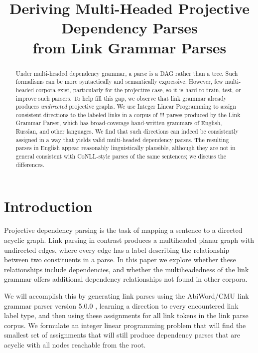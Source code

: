 \documentclass[11pt]{article}
\title{Deriving Multi-Headed Projective Dependency Parses \\ from Link Grammar Parses}
\date{}
\newcommand{\Note}[4][]{\todo[author=#2,color=#3,fancyline,#1]{#4}}
\newcommand{\noteJE}[2][]{\Note[#1]{JE}{green!40}{#2}}
\begin{document}
\maketitle

\begin{abstract}
Under multi-headed dependency grammar, a parse is a DAG rather than a tree.  Such formalisms can be more syntactically and semantically expressive.  However, few multi-headed corpora exist, particularly for the projective case, so it is hard to train, test, or improve such parsers.
To help fill this gap, we observe that link grammar already produces {\em undirected} projective graphs.  
We use Integer Linear Programming to assign consistent directions to the labeled links in a corpus of !!! \noteJE{fill in the number} parses produced by the Link Grammar Parser, which has broad-coverage hand-written grammars of English, Russian, and other languages.  We find that such directions can indeed be consistently assigned in a way that yields valid multi-headed dependency parses. The resulting parses in English appear reasonably linguistically plausible, although they are not in general consistent with CoNLL-style parses of the same sentences; we discuss the differences.  
\end{abstract}


\section{Introduction}
Projective dependency parsing is the task of mapping a sentence to a directed acyclic graph.  
Link parsing in contrast produces a multiheaded planar graph with undirected edges, where every edge has a label describing the relationship between two constituents in a parse. In this paper we explore whether these relationships include dependencies, and whether the multiheadedness of the link grammar offers additional dependency relationships not found in other corpora.

We will accomplish this by generating link parses using the AbiWord/CMU link grammar parser version 5.0.0 \noteJE{is this the version you used?} \cite{LINKPARSER-2014}, learning a direction to every encountered link label type, and then using these assignments for all link tokens in the link parse corpus. We formulate an integer linear programming problem that will find the smallest set of assignments that will still produce dependency parses that are acyclic with all nodes reachable from the root.
\end{document}
